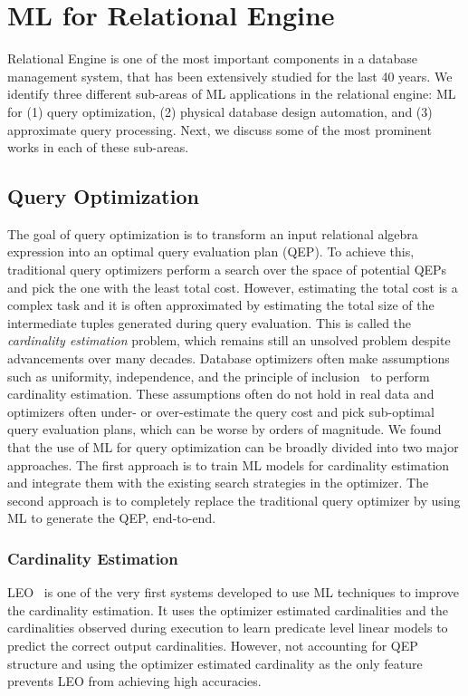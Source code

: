 \section{ML for Relational Engine}
Relational Engine is one of the most important components in a database management system,  that has been extensively studied for the last 40 years.
We identify three different sub-areas of ML applications in the relational engine: ML for (1) query optimization, (2) physical database design automation, and (3) approximate query processing.
Next, we discuss some of the most prominent works in each of these sub-areas.

\subsection{Query Optimization}
The goal of query optimization is to transform an input relational algebra expression into an optimal query evaluation plan (QEP).
To achieve this, traditional query optimizers perform a search over the space of potential QEPs and pick the one with the least total cost.
However, estimating the total cost is a complex task and it is often approximated by estimating the total size of the intermediate tuples generated during query evaluation.
This is called the \textit{cardinality estimation} problem, which remains still an unsolved problem despite advancements over many decades. 
Database optimizers often make assumptions such as uniformity, independence, and the principle of inclusion~\cite{leis2018query} to perform cardinality estimation.
These assumptions often do not hold in real data and optimizers often under- or over-estimate the query cost and pick sub-optimal query evaluation plans, which can be worse by orders of magnitude.
We found that the use of ML for query optimization can be broadly divided into two major approaches.
The first approach is to train ML models for cardinality estimation and integrate them with the existing search strategies in the optimizer.
The second approach is to completely replace the traditional query optimizer by using ML to generate the QEP, end-to-end.

\subsubsection{Cardinality Estimation}
LEO~\cite{leo} is one of the very first systems developed to use ML techniques to improve the cardinality estimation.
It uses the optimizer estimated cardinalities and the cardinalities observed during execution to learn predicate level linear models to predict the correct output cardinalities.
However, not accounting for QEP structure and using the optimizer estimated cardinality as the only feature prevents LEO from achieving high accuracies.

